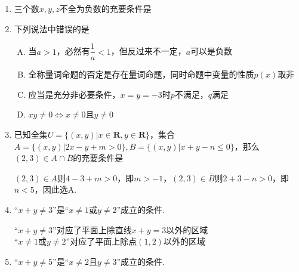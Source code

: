 \begin{enumerate}
\begin{enumerate}
    \item 三个数$x,y,z$不全为负数的充要条件是
    \item 下列说法中错误的是
    \begin{jieda}
        \begin{enumerate}[A.]
            \item 当$a > 1$，必然有$\dfrac{1}{a} < 1$，但反过来不一定，$a$可以是负数
            \item 全称量词命题的否定是存在量词命题，同时命题中变量的性质$p(x)$取非
            \item 应当是充分非必要条件，$x = y = -3$时$p$不满足，$q$满足
            \item $xy \neq 0 \Leftrightarrow x \neq 0 \mbox{且} y \neq 0$
        \end{enumerate}
    \end{jieda}
    \item 已知全集$U = \{(x, y) | x \in \mathbf{R}, y \in \mathbf{R}\}$，集合$A = \{(x, y) | 2x-y+m > 0\}, B = \{(x, y)| x+y-n \leq 0\}$，那么$(2, 3) \in A \cap \overline{B}$的充要条件是
    \begin{jieda}
        $(2, 3) \in A$则$4-3+m > 0$，即$m > -1$，$(2, 3) \in \overline{B}$则$2 + 3 - n > 0$，即$n < 5$，因此选A.
    \end{jieda}
    \item “$x+y \neq 3$”是“$x \neq 1 \mbox{或} y \neq 2$”成立的条件.
    \begin{jieda}
        “$x+y \neq 3$”对应了平面上除直线$x + y = 3$以外的区域 \\
        “$x \neq 1 \mbox{或} y \neq 2$”对应了平面上除点$(1,2)$以外的区域
    \end{jieda}
    \item “$x+y \neq 5$”是“$x \neq 2 \mbox{且} y \neq 3$”成立的条件.

\end{enumerate}
\end{enumerate}

